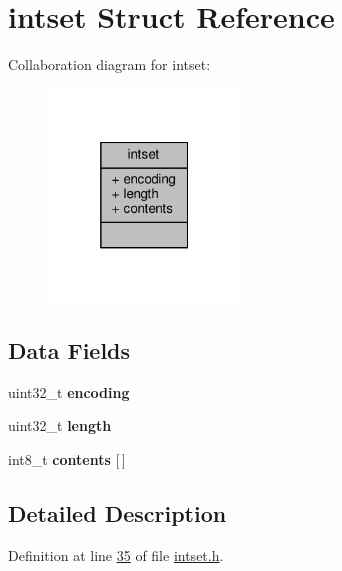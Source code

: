 \hypertarget{structintset}{}\section{intset Struct Reference}
\label{structintset}


Collaboration diagram for intset\+:\nopagebreak
\begin{figure}[H]
\begin{center}
\leavevmode
\includegraphics[width=145pt]{structintset__coll__graph}
\end{center}
\end{figure}
\subsection*{Data Fields}
\begin{DoxyCompactItemize}
\item 
\mbox{\label{structintset_a3ca6cf191674fddca8f0dfb4f5b95e93}} 
uint32\+\_\+t {\bfseries encoding}
\item 
\mbox{\label{structintset_ad66dd457f30a392c772e4b33bb257c9e}} 
uint32\+\_\+t {\bfseries length}
\item 
\mbox{\label{structintset_a8bb8c906b07afb5e998f92830dcc7e0b}} 
int8\+\_\+t {\bfseries contents} \mbox{[}$\,$\mbox{]}
\end{DoxyCompactItemize}


\subsection{Detailed Description}


Definition at line \hyperlink{intset_8h_source_l00035}{35} of file \hyperlink{intset_8h_source}{intset.\+h}.



